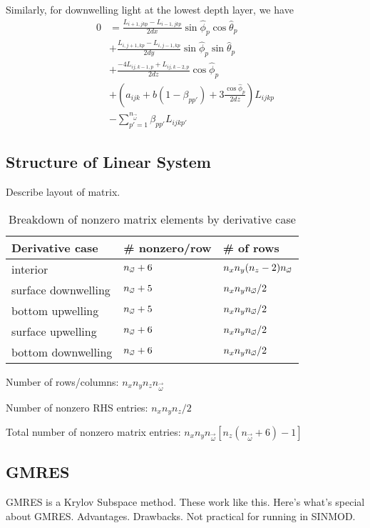 Similarly, for downwelling light at the lowest depth layer, we have
\begin{equation}
  \begin{aligned}
    0 &= \frac{L_{i+1,jkp}-L_{i-1,jkp}}{2dx}\sin\hat{\phi}_p\cos\hat{\theta}_p \\
    &+ \frac{L_{i,j+1,kp}-L_{i,j-1,kp}}{2dy}\sin\hat{\phi}_p\sin\hat{\theta}_p \\
    &+ \frac{-4L_{ij,k-1,p} + L_{ij,k-2,p}}{2dz}\cos\hat{\phi}_p \\
    &+ \left(a_{ijk}+b(1-\beta_{pp'}) + 3\frac{\cos\hat\phi_p}{2dz} \right)L_{ijkp} \\
    &- \sum_{p'=1}^{n_{\vec{\omega}}} \beta_{pp'} L_{ijkp'}
  \end{aligned}
\end{equation}

\subsection{Structure of Linear System}

Describe layout of matrix.

\begin{table}[H]
  \centering
  \begin{tabular}{p{}p{}p{}}
    \toprule
    \textbf{Derivative case} & \textbf{\# nonzero/row} & \textbf{\# of rows} \\
    \midrule
    interior & ${n_{\vec{\omega}}}+6$ & $n_xn_y(n_z-2){n_{\vec{\omega}}}$ \\
    surface downwelling & ${n_{\vec{\omega}}}+5$ & $n_xn_y{n_{\vec{\omega}}}/2$ \\
    bottom upwelling & ${n_{\vec{\omega}}}+5$ & $n_xn_y{n_{\vec{\omega}}}/2$ \\
    surface upwelling & ${n_{\vec{\omega}}}+6$ & $n_xn_y{n_{\vec{\omega}}}/2$ \\
    bottom downwelling & ${n_{\vec{\omega}}}+6$ & $n_xn_y{n_{\vec{\omega}}}/2$ \\
  \end{tabular}
  \caption{Breakdown of nonzero matrix elements by derivative case}
\end{table}

Number of rows/columns: $n_xn_yn_zn_{\vec{\omega}}$

Number of nonzero RHS entries: $n_xn_yn_z/2$

Total number of nonzero matrix entries: $n_xn_yn_{\vec{\omega}} \left[n_z(n_{\vec{\omega}}+6)-1 \right]$

\subsection{GMRES}
GMRES is a Krylov Subspace method. These work like this. Here's what's special
about GMRES. Advantages. Drawbacks. Not practical for running in SINMOD.

